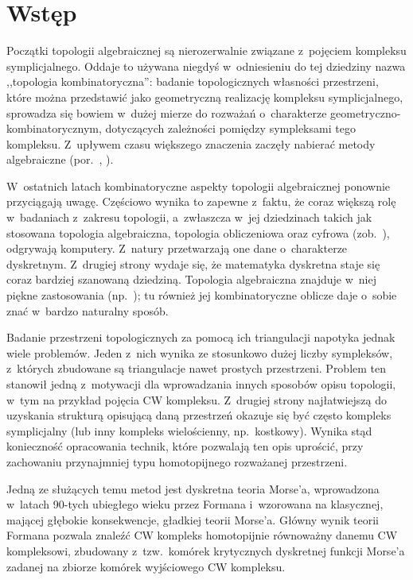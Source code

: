 \chapter{Wstęp}
Początki topologii algebraicznej są nierozerwalnie związane z~pojęciem kompleksu symplicjalnego. Oddaje to używana niegdyś w~odniesieniu do tej dziedziny nazwa ,,topologia kombinatoryczna'': badanie topologicznych własności przestrzeni, które można przedstawić jako geometryczną realizację kompleksu symplicjalnego, sprowadza się bowiem w~dużej mierze do rozważań o~charakterze geometryczno-kombinatorycznym, dotyczących zależności pomiędzy sympleksami tego kompleksu. Z~upływem czasu większego znaczenia zaczęły nabierać metody algebraiczne (por.~\cite{Dieudonne09}, \cite{James06}).

W~ostatnich latach kombinatoryczne aspekty topologii algebraicznej ponownie przyciągają uwagę. Częściowo wynika to zapewne z~faktu, że coraz większą rolę w~badaniach z~zakresu topologii, a~zwłaszcza w~jej dziedzinach takich jak stosowana topologia algebraiczna, topologia obliczeniowa oraz cyfrowa (zob.~\cite{Kovalevsky08,Sergeraert,Edelsbrunner10,Zomorodian05,Kaczynski04}), odgrywają komputery. Z~natury przetwarzają one dane o~charakterze dyskretnym. Z~drugiej strony wydaje się, że matematyka dyskretna staje się coraz bardziej szanowaną dziedziną. Topologia algebraiczna znajduje w~niej piękne zastosowania (np.~\cite{Matousek03,Kozlov08,Bjorner95,Jonsson08}); tu również jej kombinatoryczne oblicze daje o~sobie znać w~bardzo naturalny sposób.

Badanie przestrzeni topologicznych za pomocą ich triangulacji napotyka jednak wiele problemów. Jeden z~nich wynika ze stosunkowo dużej liczby sympleksów, z~których zbudowane są triangulacje nawet prostych przestrzeni. Problem ten stanowił jedną z~motywacji dla wprowadzania innych sposobów opisu topologii, w~tym na przykład pojęcia CW kompleksu. Z~drugiej strony najłatwiejszą do uzyskania strukturą opisującą daną przestrzeń okazuje się być często kompleks symplicjalny (lub inny kompleks wielościenny, np.~kostkowy). Wynika stąd konieczność opracowania technik, które pozwalają ten opis uprościć, przy zachowaniu przynajmniej typu homotopijnego rozważanej przestrzeni.

Jedną ze służących temu metod jest dyskretna teoria Morse'a, wprowadzona w~latach 90-tych ubiegłego wieku przez Formana \cite{Forman98} i~wzorowana na klasycznej, mającej głębokie konsekwencje, gładkiej teorii Morse'a. Główny wynik teorii Formana \cite[Corollary 3.5]{Forman98} pozwala znaleźć CW kompleks homotopijnie równoważny danemu CW kompleksowi, zbudowany z~tzw.~komórek krytycznych dyskretnej funkcji Morse'a zadanej na zbiorze komórek wyjściowego CW kompleksu.

